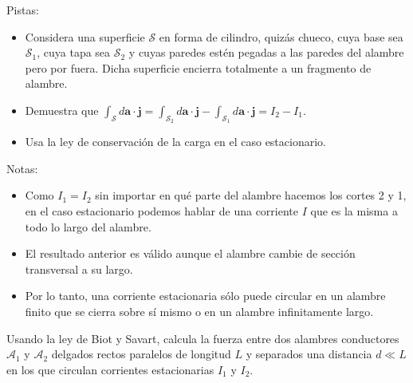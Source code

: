 \documentclass{exam}
\begin{document}
\begin{questions}
    Pistas:
    \begin{itemize}
    \item Considera una superficie $\mathcal S$ en forma de cilindro,
      quizás chueco, cuya base sea
      $\mathcal S_1$, cuya tapa sea $\mathcal S_2$ y cuyas paredes
      estén pegadas a las paredes del alambre pero por fuera. Dicha
      superficie encierra totalmente a un fragmento de alambre.
    \item Demuestra que $\int_{\mathcal S}d\bm a\cdot\bm
      j=\int_{\mathcal S_2}d\bm a\cdot\bm j - \int_{\mathcal
        S_1}d\bm a\cdot\bm j=I_2-I_1$.
    \item Usa la ley de conservación de la carga en el caso estacionario.
    \end{itemize}
    Notas:
    \begin{itemize}
    \item Como $I_1=I_2$ sin importar en qué parte del alambre hacemos
      los cortes 2 y 1, en el caso estacionario podemos hablar de una
      corriente $I$ que es la misma a todo lo largo del alambre.
    \item El resultado anterior es válido aunque el alambre cambie de
      sección transversal a su largo.
    \item Por lo tanto, una corriente estacionaria sólo puede circular
      en un alambre finito que se cierra sobre sí mismo o en un
      alambre infinitamente largo.
    \end{itemize}


  \question Usando la ley de Biot y Savart, calcula la fuerza entre
    dos alambres conductores $\mathcal A_1$ y $\mathcal A_2$ delgados
    rectos paralelos de longitud $L$ y
    separados una distancia $d\ll L$ en los que circulan corrientes
    estacionarias $I_1$ y $I_2$.


\end{questions}
\end{document}
